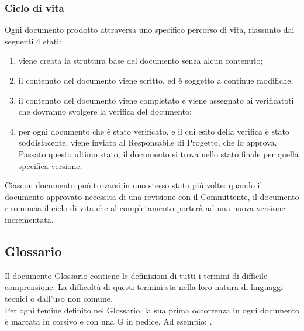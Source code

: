 \subsubsection{Ciclo di vita}
Ogni documento prodotto attraversa uno specifico percorso di vita, riassunto dai seguenti 4 stati:
\begin{enumerate}
\item {}viene creata la struttura base del documento senza alcun contenuto;
\item {}il contenuto del documento viene scritto, ed è soggetto a continue modifiche;
\item {}il contenuto del documento viene completato e viene assegnato ai verificatoti che dovranno svolgere la verifica del documento;
\item {}per ogni documento che è stato verificato, e il cui esito della verifica è stato soddisfacente, viene inviato al Responsabile di Progetto, che lo approva. Passato questo ultimo stato, il documento si trova nello stato finale per quella specifica versione. 
\end{enumerate}

Ciascun documento può trovarsi in uno stesso stato più volte: quando il documento approvato necessita di una revisione con il Committente, il documento ricomincia il ciclo di vita che al completamento porterà ad una nuova versione incrementata.
\newpage

\subsection{Glossario}
\label{9.0}
Il documento Glossario contiene le definizioni di tutti i termini di difficile comprensione. La difficoltà di questi termini sta nella loro natura di linguaggi tecnici o dall'uso non comune. \\
Per ogni temine definito nel Glossario, la sua prima occorrenza in ogni documento è marcata in corsivo e con una G in pedice. Ad esempio: .

